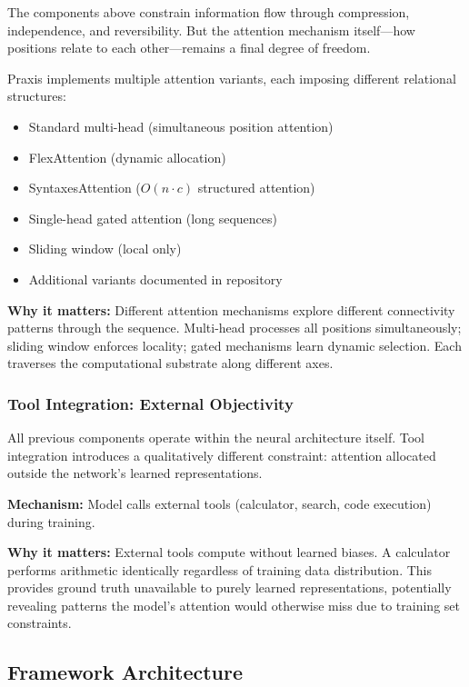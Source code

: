\documentclass{article}
\begin{document}
The components above constrain information flow through compression, independence, and reversibility. But the attention mechanism itself—how positions relate to each other—remains a final degree of freedom.

Praxis implements multiple attention variants, each imposing different relational structures:
\begin{itemize}[noitemsep]
    \item Standard multi-head (simultaneous position attention)
    \item FlexAttention (dynamic allocation)
    \item SyntaxesAttention ($O(n \cdot c)$ structured attention)
    \item Single-head gated attention (long sequences)
    \item Sliding window (local only)
    \item Additional variants documented in repository
\end{itemize}

\textbf{Why it matters:} Different attention mechanisms explore different connectivity patterns through the sequence. Multi-head processes all positions simultaneously; sliding window enforces locality; gated mechanisms learn dynamic selection. Each traverses the computational substrate along different axes.

\subsubsection{Tool Integration: External Objectivity}

All previous components operate within the neural architecture itself. Tool integration introduces a qualitatively different constraint: attention allocated outside the network's learned representations.

\textbf{Mechanism:} Model calls external tools (calculator, search, code execution) during training.

\textbf{Why it matters:} External tools compute without learned biases. A calculator performs arithmetic identically regardless of training data distribution. This provides ground truth unavailable to purely learned representations, potentially revealing patterns the model's attention would otherwise miss due to training set constraints.

\subsection{Framework Architecture}
\end{document}
